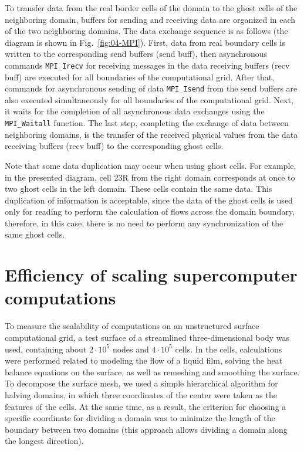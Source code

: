 \documentclass[
11pt,%
tightenlines,%
twoside,%
onecolumn,%
nofloats,%
nobibnotes,%
nofootinbib,%
superscriptaddress,%
noshowpacs,%
centertags]%
{revtex4}
\begin{document}
To transfer data from the real border cells of the domain to the ghost cells of the neighboring domain, buffers for sending and receiving data are organized in each of the two neighboring domains.
The data exchange sequence is as follows (the diagram is shown in Fig.~\ref{fig:04-MPI}).
First, data from real boundary cells is written to the corresponding send buffers (send buff), then asynchronous commands \texttt{MPI\_Irecv} for receiving messages in the data receiving buffers (recv buff) are executed for all boundaries of the computational grid.
After that, commands for asynchronous sending of data \texttt{MPI\_Isend} from the send buffers are also executed simultaneously for all boundaries of the computational grid.
Next, it waits for the completion of all asynchronous data exchanges using the \texttt{MPI\_Waitall} function.
The last step, completing the exchange of data between neighboring domains, is the transfer of the received physical values from the data receiving buffers (recv buff) to the corresponding ghost cells.

Note that some data duplication may occur when using ghost cells.
For example, in the presented diagram, cell 23R from the right domain corresponds at once to two ghost cells in the left domain.
These cells contain the same data.
This duplication of information is acceptable, since the data of the ghost cells is used only for reading to perform the calculation of flows across the domain boundary, therefore, in this case, there is no need to perform any synchronization of the same ghost cells.

\section{Efficiency of scaling supercomputer computations}

To measure the scalability of computations on an unstructured surface computational grid, a test surface of a streamlined three-dimensional body was used, containing about $ 2 \cdot 10^5 $ nodes and $ 4 \cdot 10^5 $ cells.
In the cells, calculations were performed related to modeling the flow of a liquid film, solving the heat balance equations on the surface, as well as remeshing and smoothing the surface.
To decompose the surface mesh, we used a simple hierarchical algorithm for halving domains, in which three coordinates of the center were taken as the features of the cells.
At the same time, as a result, the criterion for choosing a specific coordinate for dividing a domain was to minimize the length of the boundary between two domains (this approach allows dividing a domain along the longest direction).
\end{document}
